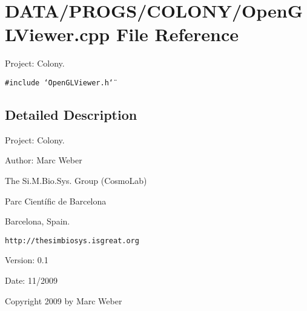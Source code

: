 \section{DATA/PROGS/COLONY/OpenGLViewer.cpp File Reference}
\label{OpenGLViewer_8cpp}
Project: Colony. 

{\tt \#include \char`\"{}OpenGLViewer.h\char`\"{}}\par


\subsection{Detailed Description}
Project: Colony. 

\begin{Desc}
\item[Author:]Marc Weber\par
 The Si.M.Bio.Sys. Group (CosmoLab)\par
 Parc Científic de Barcelona\par
 Barcelona, Spain.\par
 {\tt http://thesimbiosys.isgreat.org} \end{Desc}
\begin{Desc}
\item[Version:]0.1 \end{Desc}
\begin{Desc}
\item[Date:]11/2009\end{Desc}
Copyright 2009 by Marc Weber 